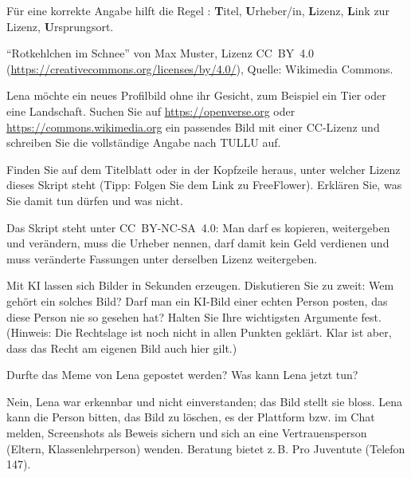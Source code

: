 Für eine korrekte Angabe hilft die Regel : \textbf{T}itel, \textbf{U}rheber/in, \textbf{L}izenz, \textbf{L}ink zur Lizenz, \textbf{U}rsprungsort.

\begin{myexample}
	\enquote{Rotkehlchen im Schnee} von Max Muster, Lizenz CC~BY~4.0 (\url{https://creativecommons.org/licenses/by/4.0/}), Quelle: Wikimedia Commons.
\end{myexample}

\begin{myexercise}
	Lena möchte ein neues Profilbild ohne ihr Gesicht, zum Beispiel ein Tier oder eine Landschaft.
	Suchen Sie auf \url{https://openverse.org} oder \url{https://commons.wikimedia.org} ein passendes Bild mit einer \gls{CC}-Lizenz
	und schreiben Sie die vollständige Angabe nach TULLU auf.
	\schreibzeile
	\schreibzeile
\end{myexercise}

\begin{mychallenge}
	Finden Sie auf dem Titelblatt oder in der Kopfzeile heraus, unter welcher Lizenz dieses Skript steht
	(Tipp: Folgen Sie dem Link zu FreeFlower). Erklären Sie, was Sie damit tun dürfen und was nicht.
	\schreibzeile
	\schreibzeile
	\begin{myanswer}
		Das Skript steht unter \gls{CC}~BY-NC-SA~4.0: Man darf es kopieren, weitergeben und verändern,
		muss die Urheber nennen, darf damit kein Geld verdienen und muss veränderte Fassungen unter derselben Lizenz weitergeben.
	\end{myanswer}
\end{mychallenge}

\begin{mychallenge}
	Mit \gls{KI} lassen sich Bilder in Sekunden erzeugen. Diskutieren Sie zu zweit: Wem gehört ein solches Bild?
	Darf man ein KI-Bild einer echten Person posten, das diese Person nie so gesehen hat?
	Halten Sie Ihre wichtigsten Argumente fest. (Hinweis: Die Rechtslage ist noch nicht in allen Punkten geklärt. Klar ist aber, dass das Recht am eigenen Bild auch hier gilt.)
	\schreibzeile
	\schreibzeile
\end{mychallenge}

\begin{fallakte}[-- Station C]
	Durfte das Meme von Lena gepostet werden? Was kann Lena jetzt tun?
	\schreibzeile
	\schreibzeile
	\schreibzeile
	\begin{myanswer}
		Nein, Lena war erkennbar und nicht einverstanden; das Bild stellt sie bloss.
		Lena kann die Person bitten, das Bild zu löschen, es der Plattform bzw. im Chat melden, Screenshots als Beweis sichern
		und sich an eine Vertrauensperson (Eltern, Klassenlehrperson) wenden. Beratung bietet z.\,B. Pro Juventute (Telefon 147).
	\end{myanswer}
\end{fallakte}

